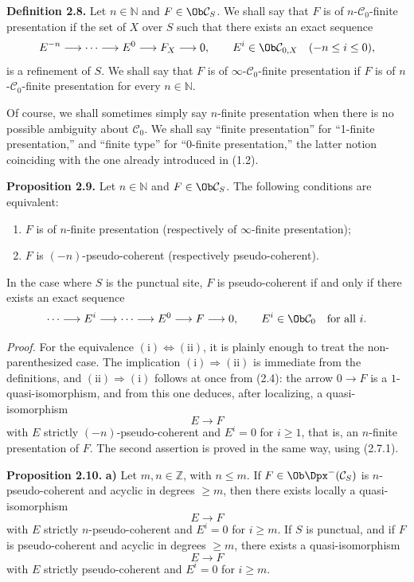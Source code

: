 \documentclass[11pt]{article}
\begin{document}
\textbf{Definition 2.8.} Let \(n\in\mathbb N\) and \(F\in\Ob\mathcal C_S\). We shall say that \(F\) is of \(n\)-\(\mathcal C_0\)-finite presentation if the set of \(X\) over \(S\) such that there exists an exact sequence
\[
  E^{-n}\longrightarrow\cdots\longrightarrow E^0\longrightarrow F_X\longrightarrow 0,
\qquad E^i\in\Ob\mathcal C_{0,X}\quad(-n\leq i\leq 0),
\]
is a refinement of \(S\). We shall say that \(F\) is of \(\infty\)-\(\mathcal C_0\)-finite presentation if \(F\) is of \(n\)-\(\mathcal C_0\)-finite presentation for every \(n\in\mathbb N\).

Of course, we shall sometimes simply say \(n\)-finite presentation when there is no possible ambiguity about \(\mathcal C_0\). We shall say ``finite presentation'' for ``1-finite presentation,'' and ``finite type'' for ``0-finite presentation,'' the latter notion coinciding with the one already introduced in (1.2).

\textbf{Proposition 2.9.} Let \(n\in\mathbb N\) and \(F\in\Ob\mathcal C_S\). The following conditions are equivalent:
\begin{enumerate}[label=(\roman*)]
\item \(F\) is of \(n\)-finite presentation (respectively of \(\infty\)-finite presentation);
\item \(F\) is \((-n)\)-pseudo-coherent (respectively pseudo-coherent).
\end{enumerate}
In the case where \(S\) is the punctual site, \(F\) is pseudo-coherent if and only if there exists an exact sequence
\[
  \cdots\longrightarrow E^i\longrightarrow\cdots\longrightarrow E^0\longrightarrow F\longrightarrow 0,
\qquad E^i\in\Ob\mathcal C_0\quad\text{for all }i.
\]

\emph{Proof.} For the equivalence \((\mathrm{i})\Leftrightarrow(\mathrm{ii})\), it is plainly enough to treat the non-parenthesized case. The implication \((\mathrm{i})\Rightarrow(\mathrm{ii})\) is immediate from the definitions, and \((\mathrm{ii})\Rightarrow(\mathrm{i})\) follows at once from (2.4): the arrow \(0\to F\) is a \(1\)-quasi-isomorphism, and from this one deduces, after localizing, a quasi-isomorphism
\[
  E\longrightarrow F
\]
with \(E\) strictly \((-n)\)-pseudo-coherent and \(E^i=0\) for \(i\geq 1\), that is, an \(n\)-finite presentation of \(F\). The second assertion is proved in the same way, using (2.7.1).

\textbf{Proposition 2.10.} \textbf{a)} Let \(m,n\in\mathbb Z\), with \(n\leq m\). If \(F\in\Ob\Dpx^-(\mathcal C_S)\) is \(n\)-pseudo-coherent and acyclic in degrees \(\geq m\), then there exists locally a quasi-isomorphism
\[
  E\longrightarrow F
\]
with \(E\) strictly \(n\)-pseudo-coherent and \(E^i=0\) for \(i\geq m\). If \(S\) is punctual, and if \(F\) is pseudo-coherent and acyclic in degrees \(\geq m\), there exists a quasi-isomorphism
\[
  E\longrightarrow F
\]
with \(E\) strictly pseudo-coherent and \(E^i=0\) for \(i\geq m\).
\end{document}
